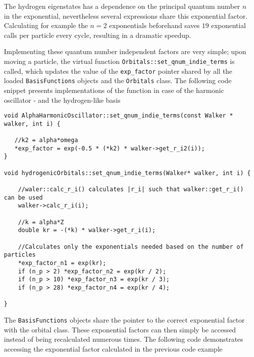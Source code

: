 The hydrogen eigenstates has a dependence on the principal quantum number $n$ in the exponential, nevertheless several expressions share this exponential factor. Calculating for example the $n=2$ exponentials beforehand saves $19$ exponential calls per particle every cycle, resulting in a dramatic speedup.

Implementing these quantum number independent factors are very simple; upon moving a particle, the virtual function \verb+Orbitals::set_qnum_indie_terms+ is called, which updates the value of the \verb+exp_factor+  pointer shared by all the loaded \verb+BasisFunctions+ objects and the \verb+Orbitals+ class. The following code snippet presents implementations of the function in case of the harmonic oscillator - and the hydrogen-like basis


\vspace{0.5cm}
\begin{lstlisting}[caption={Implementation of the function handling the calculation of the quantum number independent terms. Lines 1-5 describe the harmonic oscillator case, where the exponential factor $\exp(-\alpha\omega r_i^2)$ is the independent factor. Lines 7-21 describe the hydrogen-like case, where the calculated exponential factor $\exp(-\alpha Z |r_i|/n)$ has a dependence on the principal quantum number $n$. One factor is thus calculated per $n$, however, if no particles occupy states with a given $n$, the corresponding factor is not calculated (see lines 17-19). }]
void AlphaHarmonicOscillator::set_qnum_indie_terms(const Walker * walker, int i) {
   
   //k2 = alpha*omega 
   *exp_factor = exp(-0.5 * (*k2) * walker->get_r_i2(i));
}

void hydrogenicOrbitals::set_qnum_indie_terms(Walker* walker, int i) {

    //waler::calc_r_i() calculates |r_i| such that walker::get_r_i() can be used
    walker->calc_r_i(i);

    //k = alpha*Z 
    double kr = -(*k) * walker->get_r_i(i);
    
    //Calculates only the exponentials needed based on the number of particles
    *exp_factor_n1 = exp(kr);
    if (n_p > 2) *exp_factor_n2 = exp(kr / 2);
    if (n_p > 10) *exp_factor_n3 = exp(kr / 3);
    if (n_p > 28) *exp_factor_n4 = exp(kr / 4);

}
\end{lstlisting}

The \verb+BasisFunctions+ objects share the pointer to the correct exponential factor with the orbital class. These exponential factors can then simply be accessed instead of being recalculated numerous times. The following code demonstrates accessing the exponential factor calculated in the previous code example

